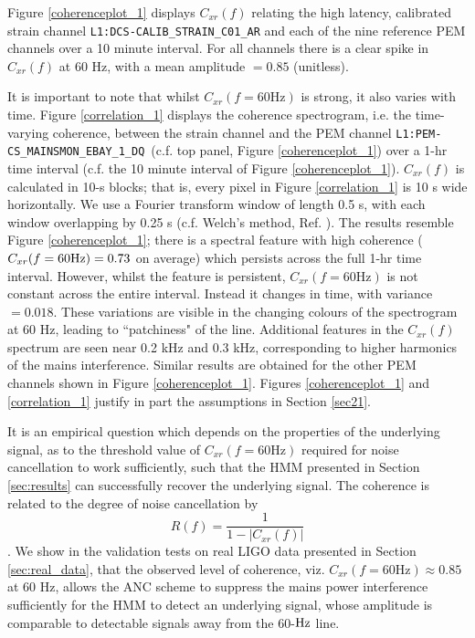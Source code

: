 \documentclass[pra,superscriptaddress,reprint,amsmath,amssymb,nofootinbib]{revtex4-2}
\newcommand{\PEMChanName}{\texttt{L1:PEM-CS\_MAINSMON\_EBAY\_1\_DQ}}
\begin{document}
Figure \ref{coherenceplot_1} displays $C_{xr}(f)$ relating the high latency, calibrated strain channel \texttt{L1:DCS-CALIB\_STRAIN\_C01\_AR} and each of the nine reference PEM channels over a 10 minute interval. For all channels there is a clear spike in $C_{xr}(f)$ at 60 Hz, with a mean amplitude $=0.85$ (unitless). \newline 

 It is important to note that whilst $C_{xr}(f=60 \text{Hz})$ is strong, it also varies with time. Figure \ref{correlation_1} displays the coherence spectrogram, i.e. the time-varying coherence, between the strain channel and the PEM channel \PEMChanName \, (c.f. top panel, Figure \ref{coherenceplot_1}) over a 1-hr time interval (c.f. the 10 minute interval of Figure \ref{coherenceplot_1}). $C_{xr}(f)$ is calculated in 10-s blocks; that is, every pixel in Figure \ref{correlation_1} is 10 s wide horizontally. We use a Fourier transform window of length 0.5 s, with each window overlapping by 0.25 s (c.f. Welch's method, Ref. \citep{Welch1161901}). The results resemble Figure \ref{coherenceplot_1}; there is a spectral feature with high coherence ($C_{xr}(f=60 \rm Hz) = 0.73$ on average) which persists across the full 1-hr time interval. However, whilst the feature is persistent, $C_{xr}(f=60 \text{Hz})$ is not constant across the entire interval. Instead it changes in time, with variance $=0.018$. These variations are visible in the changing colours of the spectrogram at 60 Hz, leading to ``patchiness" of the line. Additional features in the $C_{xr}(f)$ spectrum are seen near 0.2 kHz and 0.3 kHz, corresponding to higher harmonics of the mains interference. Similar results are obtained for the other PEM channels shown in Figure \ref{coherenceplot_1}. Figures  \ref{coherenceplot_1} and  \ref{correlation_1} justify in part the assumptions in Section \ref{sec21}. \newline 
 
 
 It is an empirical question which depends on the properties of the underlying signal, as to the threshold value of $C_{xr}(f=60 \text{Hz})$ required for noise cancellation to work sufficiently, such that the HMM presented in Section \ref {sec:results} can successfully recover the underlying signal. The coherence is related to the degree of noise cancellation by
 \begin{equation}
	R(f) = \frac{1}{1 - |C_{xr}(f)|}
\end{equation} 
 \cite{s22176591,625628}.  We show in the validation tests on real LIGO data presented in Section \ref{sec:real_data}, that the observed level of coherence, viz. $C_{xr}(f=60 \text{Hz}) \approx 0.85$ at 60 Hz, allows the ANC scheme to suppress the mains power interference sufficiently for the HMM to detect an underlying signal, whose amplitude is comparable to detectable signals away from the 60-${\rm Hz}$ line.
\end{document}
